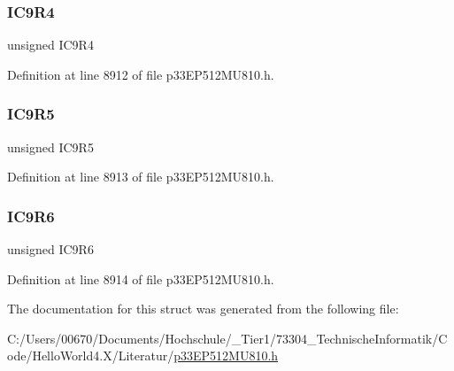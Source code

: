 \subsubsection{\texorpdfstring{I\+C9\+R4}{IC9R4}}
{\footnotesize\ttfamily unsigned I\+C9\+R4}



Definition at line 8912 of file p33\+E\+P512\+M\+U810.\+h.

\mbox{\label{structtag_r_p_i_n_r33_b_i_t_s_a356cb74af3d7f07192f9221938f79a70}} 
\subsubsection{\texorpdfstring{I\+C9\+R5}{IC9R5}}
{\footnotesize\ttfamily unsigned I\+C9\+R5}



Definition at line 8913 of file p33\+E\+P512\+M\+U810.\+h.

\mbox{\label{structtag_r_p_i_n_r33_b_i_t_s_ae34a8b6943162bb1aec77199afba95a2}} 
\subsubsection{\texorpdfstring{I\+C9\+R6}{IC9R6}}
{\footnotesize\ttfamily unsigned I\+C9\+R6}



Definition at line 8914 of file p33\+E\+P512\+M\+U810.\+h.



The documentation for this struct was generated from the following file\+:\begin{DoxyCompactItemize}
\item 
C\+:/\+Users/00670/\+Documents/\+Hochschule/\+\_\+\+Tier1/73304\+\_\+\+Technische\+Informatik/\+Code/\+Hello\+World4.\+X/\+Literatur/\hyperlink{p33_e_p512_m_u810_8h}{p33\+E\+P512\+M\+U810.\+h}\end{DoxyCompactItemize}
